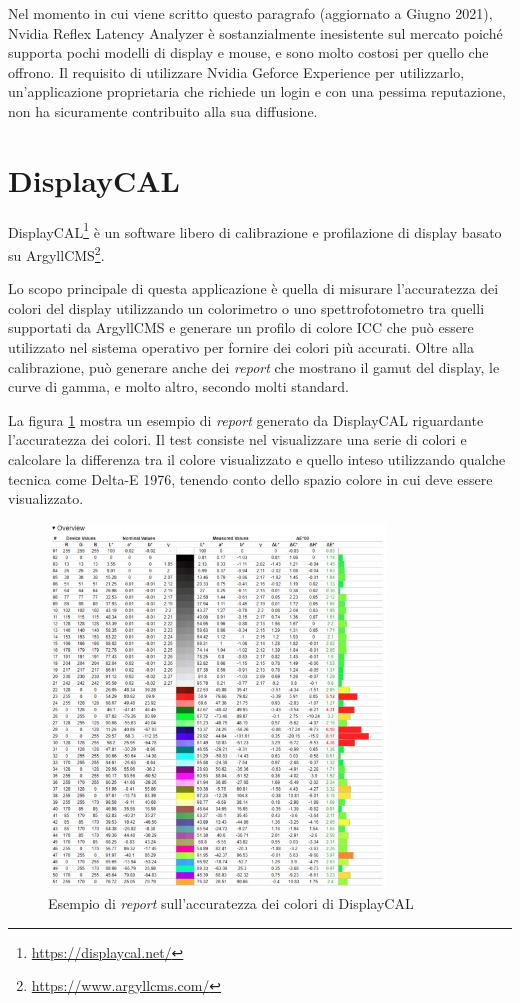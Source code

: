 Nel momento in cui viene scritto questo paragrafo (aggiornato a Giugno 2021), Nvidia Reflex Latency Analyzer è sostanzialmente inesistente sul mercato poiché supporta pochi modelli di display e mouse, e sono molto costosi per quello che offrono. Il requisito di utilizzare Nvidia Geforce Experience per utilizzarlo, un'applicazione proprietaria che richiede un login e con una pessima reputazione, non ha sicuramente contribuito alla sua diffusione.

\section{DisplayCAL}
DisplayCAL\footnote{\url{https://displaycal.net/}} è un software libero di calibrazione e profilazione di display basato su ArgyllCMS\footnote{\url{https://www.argyllcms.com/}}.

Lo scopo principale di questa applicazione è quella di misurare l'accuratezza dei colori del display utilizzando un colorimetro o uno spettrofotometro tra quelli supportati da ArgyllCMS e generare un profilo di colore ICC che può essere utilizzato nel sistema operativo per fornire dei colori più accurati. Oltre alla calibrazione, può generare anche dei \textit{report} che mostrano il gamut del display, le curve di gamma, e molto altro, secondo molti standard.

La figura \ref{fig:displaycal_report_example} mostra un esempio di \textit{report} generato da DisplayCAL riguardante l'accuratezza dei colori. Il test consiste nel visualizzare una serie di colori e calcolare la differenza tra il colore visualizzato e quello inteso utilizzando qualche tecnica come Delta-E 1976, tenendo conto dello spazio colore in cui deve essere visualizzato.

\begin{figure}[h!]
	\centering
	\includegraphics[width=0.8\textwidth]{StatoDellArte_files/displaycal_report_example.jpg}
	\caption{Esempio di \textit{report} sull'accuratezza dei colori di DisplayCAL}
	\label{fig:displaycal_report_example}
\end{figure}

